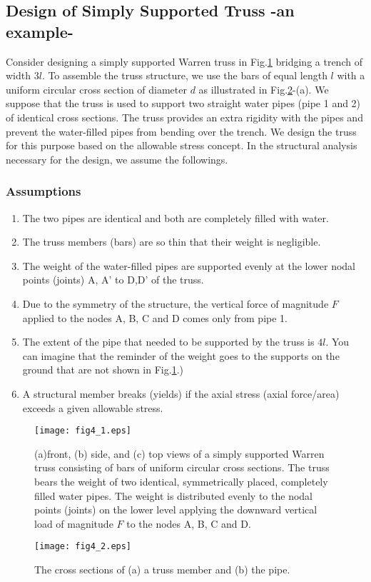 \documentclass[10pt,a4j]{article}
\begin{document}
\subsection{Design of Simply Supported Truss -an example-}
Consider designing a simply supported Warren truss in Fig.\ref{fig:fig4_1} bridging 
a trench of width $3l$. To assemble the truss structure, we use the bars of equal 
length $l$ with a uniform circular cross section of diameter $d$ as illustrated in Fig.\ref{fig:fig4_2}-(a).
We suppose that the truss is used to support two straight water pipes (pipe 1 and 2) 
of identical cross sections. The truss provides an extra rigidity 
with the pipes and prevent the water-filled pipes from bending over the trench. 
We design the truss for this purpose based on the allowable stress concept.
In the structural analysis necessary for the design, we assume the followings.
\subsubsection{Assumptions}
\begin{enumerate}
\item
	The two pipes are identical and both are completely filled with water. 
\item
	The truss members (bars) are so thin that their weight is negligible.
\item
	The weight of the water-filled pipes are supported evenly at the lower nodal 
		points (joints) A, A' to D,D' of the truss.
\item
	Due to the symmetry of the structure, the vertical force of magnitude 
	$F$ applied to the nodes A, B, C and D comes only from pipe 1.
\item
	The extent of the pipe that needed to be supported by the truss is $4l$. 
	You can imagine that the reminder of the weight goes to the supports on the 
	ground that are not shown in Fig.\ref{fig:fig4_1}.)
\item
	A structural member breaks (yields) if the axial stress (axial force/area) 
	exceeds a given allowable stress.
\end{enumerate}
\begin{figure}
	\begin{center}
	\texttt{[image: fig4\_1.eps]} 
	\end{center}
	\caption{
		(a)front, (b) side, and (c) top views of a simply supported Warren truss consisting 
		of bars of uniform circular cross sections. 
		The truss bears the weight of two identical, symmetrically placed, completely filled water pipes.
		The weight is distributed evenly to the nodal points (joints) on the lower level 
		applying the downward vertical load of magnitude $F$ to the nodes A, B, C and D.
	}
	\label{fig:fig4_1}
\end{figure}
\begin{figure}
	\begin{center}
	\texttt{[image: fig4\_2.eps]} 
	\end{center}
	\caption{
		The cross sections of (a) a truss member and (b) the pipe.  
	}
	\label{fig:fig4_2}
\end{figure}
\end{document}
